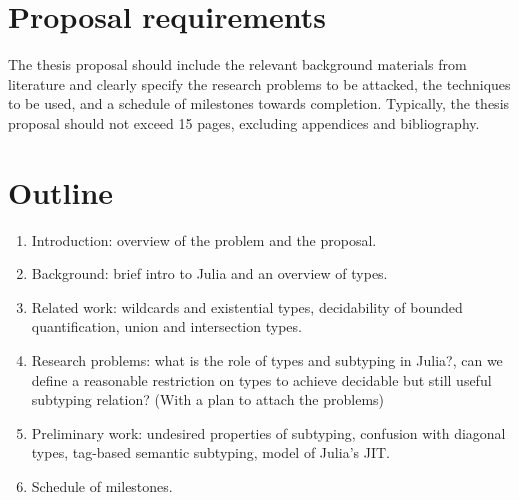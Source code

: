 \documentclass[11pt,
  footinclude,headinclude,
  abstract=on
]{scrreprt}
\begin{document}




\section{Proposal requirements}

The thesis proposal should include the relevant background materials from
literature and clearly specify the research problems to be attacked, the
techniques to be used, and a schedule of milestones towards completion.
Typically, the thesis proposal should not exceed 15 pages, excluding appendices
and bibliography.

\section{Outline}

\begin{enumerate}
  \item Introduction: overview of the problem and the proposal.
  \item Background: brief intro to Julia and an overview of types.
  \item Related work: wildcards and existential types, decidability of bounded
    quantification, union and intersection types.
  \item Research problems: what is the role of types and subtyping in Julia?,
    can we define a reasonable restriction on types to achieve decidable but
    still useful subtyping relation? (With a plan to attach the problems)
  \item Preliminary work: undesired properties of subtyping, confusion with
    diagonal types, tag-based semantic subtyping, model of Julia's JIT.
  \item Schedule of milestones.
\end{enumerate}





\end{document}
